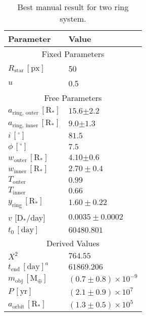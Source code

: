 \documentclass[letter]{aa} %
\begin{document}
\begin{appendix}
\begin{table}[ht]
\centering
\begin{threeparttable}
    \caption{Best manual result for two ring system.}
    \begin{tabular}{p{3cm} p{3cm}}
    \hline
    \textbf{Parameter} & {\textbf{Value}}\\
    \hline
    \hline
    \multicolumn{2}{c}{Fixed Parameters}\\
    \hline
    $R_{\ensuremath{\mathrm{star}}} \, [\ensuremath{\mathrm{px}}]$ & 50 \\
    $u$ & 0.5 \\
    \hline
    \multicolumn{2}{c}{Free Parameters}\\
    \hline
    $a_{\ensuremath{\mathrm{ring, \,outer}}} \, [\ensuremath{\mathrm{R_*}}]$ & $15.6{\pm2.2}$ \\
    $a_{\ensuremath{\mathrm{ring, \,inner}}} \, [\ensuremath{\mathrm{R_*}}]$ & $9.0{\pm1.3}$ \\
    $i \, [^\circ]$ & $81.5$ \\
    $\phi \, [^\circ]$ & $7.5$ \\
    $w_{\ensuremath{\mathrm{outer}}} \, [\ensuremath{\mathrm{R_*}}]$ & $4.10{\pm0.6}$ \\
    $w_{\ensuremath{\mathrm{inner}}} \, [\ensuremath{\mathrm{R_*}}]$ & $2.70\pm0.4$ \\
    $T_{\ensuremath{\mathrm{outer}}}$ & $0.99$ \\
    $T_{\ensuremath{\mathrm{inner}}}$ & $0.66$ \\
    $y_{\ensuremath{\mathrm{ring}}} \, [\ensuremath{\mathrm{R_*}}]$ & $1.60 \pm0.22$ \\
    $v$ [\ensuremath{\mathrm{D_*}}/day] & $0.0035\pm0.0002$ \\
    $t_0 \, [\text{day}]$ & $60480.801$ \\
    \hline
    \multicolumn{2}{c}{Derived Values}\\
    \hline
    $X^2$ & $764.55$ \\
    $t_{\ensuremath{\mathrm{end}}} \, [\text{day}]^a$ & $61869.206$ \\
    $m_{\ensuremath{\mathrm{obj}}} \, [\mathrm{M}_\oplus]$ & $(0.7\pm0.8)\times 10^{-9}$ \\
    $P \, [\text{yr}]$ & $(2.1\pm0.9)\times 10^7$  \\
    $a_{\mathrm{orbit}} \, [\ensuremath{\mathrm{R_*}}]$ & $(1.3\pm0.5)\times10^5$ \\
    \hline
    \end{tabular}
    \label{tab:best_fit}
\end{threeparttable}
\end{table}


\end{appendix}
\end{document}
